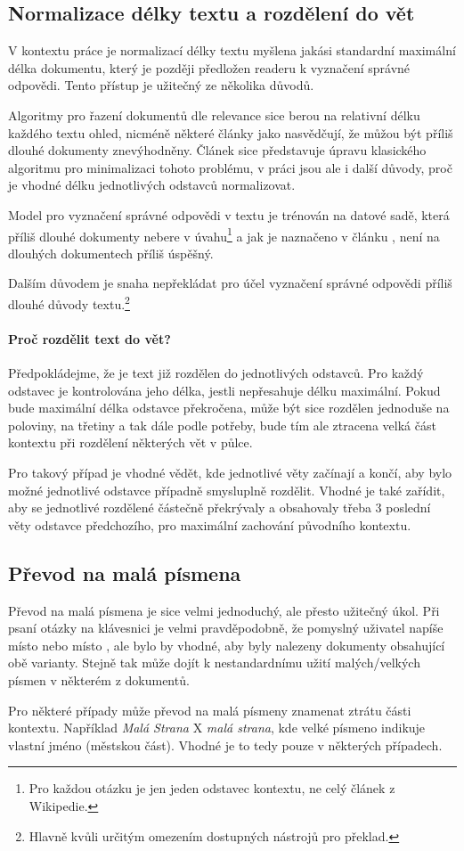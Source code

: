 \subsection{Normalizace délky textu a rozdělení do vět}
V kontextu práce je normalizací délky textu myšlena jakási standardní maximální délka dokumentu, který je později předložen readeru k vyznačení správné odpovědi. Tento přístup je užitečný ze několika důvodů.\par
Algoritmy pro řazení dokumentů dle relevance sice berou na relativní délku každého textu ohled, nicméně některé články jako \cite{bm25_too_long} nasvědčují, že můžou být příliš dlouhé dokumenty znevýhodněny. Článek \cite{bm25_too_long} sice představuje úpravu klasického algoritmu pro minimalizaci tohoto problému, v práci jsou ale i další důvody, proč je vhodné délku jednotlivých odstavců normalizovat.\par
Model pro vyznačení správné odpovědi v textu je trénován na datové sadě, která příliš dlouhé dokumenty nebere v úvahu\footnote{Pro každou otázku je jen jeden odstavec kontextu, ne celý článek z Wikipedie.} a jak je naznačeno v článku \cite{QA_long_multiple_span}, není na dlouhých dokumentech příliš úspěšný.\par
Dalším důvodem je snaha nepřekládat pro účel vyznačení správné odpovědi příliš dlouhé důvody textu.\footnote{Hlavně kvůli určitým omezením dostupných nástrojů pro překlad.}

\paragraph{Proč rozdělit text do vět?}
Předpokládejme, že je text již rozdělen do jednotlivých odstavců. Pro každý odstavec je kontrolována jeho délka, jestli nepřesahuje délku maximální. Pokud bude maximální délka odstavce překročena, může být sice rozdělen jednoduše na poloviny, na třetiny a tak dále podle potřeby, bude tím ale ztracena velká část kontextu při rozdělení některých vět v půlce.\par
Pro takový případ je vhodné vědět, kde jednotlivé věty začínají a končí, aby bylo možné jednotlivé odstavce případně smysluplně rozdělit. Vhodné je také zařídit, aby se jednotlivé rozdělené  částečně překrývaly a obsahovaly třeba 3 poslední věty odstavce předchozího, pro maximální zachování původního kontextu.

\subsection{Převod na malá písmena}
\label{prevod_na_mala}
Převod na malá písmena je sice velmi jednoduchý, ale přesto užitečný úkol. Při psaní otázky na klávesnici je velmi pravděpodobně, že pomyslný uživatel napíše  místo  nebo  místo , ale bylo by vhodné, aby byly nalezeny dokumenty obsahující obě varianty. Stejně tak může dojít k nestandardnímu užití malých/velkých písmen v některém z dokumentů.\par
Pro některé případy může převod na malá písmeny znamenat ztrátu části kontextu. Například \emph{Malá Strana} X \emph{malá strana}, kde velké písmeno indikuje vlastní jméno (městskou část). Vhodné je to tedy pouze v některých případech.

